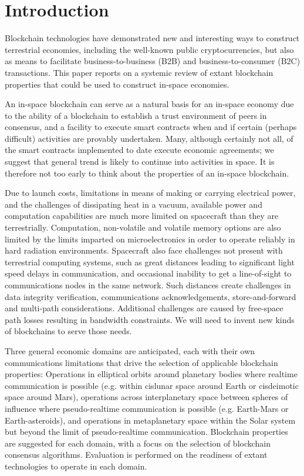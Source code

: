 \documentclass[]{aiaa-tc}%
\begin{document}
\section{Introduction}

Blockchain technologies have demonstrated new and interesting ways to construct terrestrial economies, including the well-known public cryptocurrencies, but also as means to facilitate business-to-business (B2B) and business-to-consumer (B2C) transactions. This paper reports on a systemic review of extant blockchain properties that could be used to construct in-space economies.

An in-space blockchain can serve as a natural basis for an in-space economy due to the ability of a blockchain to establish a trust environment of peers in consensus, and a facility to execute smart contracts when and if certain (perhaps difficult) activities are provably undertaken. Many, although certainly not all, of the smart contracts implemented to date execute economic agreements; we suggest that general trend is likely to continue into activities in space. It is therefore not too early to think about the properties of an in-space blockchain.

Due to launch costs, limitations in means of making or carrying electrical power, and the challenges of dissipating heat in a vacuum, available power and computation capabilities are much more limited on spacecraft than they are terrestrially. Computation, non-volatile and volatile memory options are also limited by the limits imparted on microelectronics in order to operate reliably in hard radiation environments. Spacecraft also face challenges not present with terrestrial computing systems, such as great distances leading to significant light speed delays in communication, and occasional inability to get a line-of-sight to communications nodes in the same network.  Such distances create challenges in data integrity verification, communications acknowledgements, store-and-forward and multi-path considerations. Additional challenges are caused by free-space path losses resulting in bandwidth constraints. We will need to invent new kinds of blockchains to serve those needs.

Three general economic domains are anticipated, each with their own communications limitations that drive the selection of applicable blockchain properties: Operations in elliptical orbits around planetary bodies where realtime communication is possible (e.g. within cislunar space around Earth or cisdeimotic space around Mars), operations across interplanetary space between spheres of influence where pseudo-realtime communication is possible (e.g. Earth-Mars or Earth-asteroids), and operations in metaplanetary space within the Solar system but beyond the limit of pseudo-realtime communication. Blockchain properties are suggested for each domain, with a focus on the selection of blockchain consensus algorithms. Evaluation is performed on the readiness of extant technologies to operate in each domain.
\end{document}
